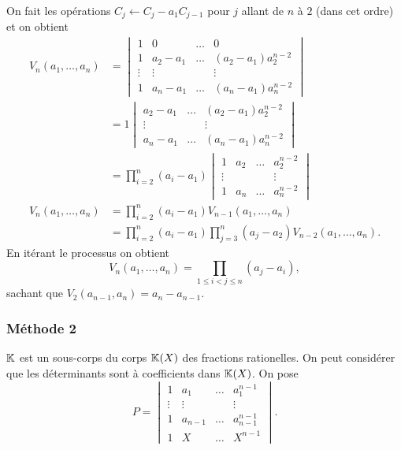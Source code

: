On fait les opérations \( C_j \leftarrow C_j - a_1C_{j-1}\) pour \(j\) allant de \(n\) à \(2\) (dans cet ordre) et on obtient
\begin{align}
V_n(a_1, \ldots, a_n) &=
  \begin{vmatrix}
    1 & 0 & \ldots & 0 \\
    1 & a_2-a_1 & \ldots & (a_2-a_1)a_2^{n-2} \\
    \vdots & \vdots &  & \vdots \\
    1 & a_n-a_1 & \ldots & (a_n-a_1)a_n^{n-2}
  \end{vmatrix}\\
  &=1
  \begin{vmatrix}
    a_2-a_1 & \ldots & (a_2-a_1)a_2^{n-2} \\
    \vdots &  & \vdots \\
    a_n-a_1 & \ldots & (a_n-a_1)a_n^{n-2}
  \end{vmatrix}\\
  &=\prod_{i=2}^n(a_i-a_1)
  \begin{vmatrix}
    1 & a_2 &\ldots & a_2^{n-2} \\
    \vdots & & & \vdots \\
    1 & a_n &\ldots & a_n^{n-2}
  \end{vmatrix}\\
V_n(a_1, \ldots, a_n)  &=\prod_{i=2}^n(a_i-a_1) V_{n-1}(a_1, \ldots, a_n) \\
&=\prod_{i=2}^n(a_i-a_1) \prod_{j=3}^n(a_j-a_2) V_{n-2}(a_1, \ldots, a_n).
\end{align}
En itérant le processus on obtient
\begin{equation}
  V_n(a_1, \ldots, a_n) = \prod_{1 \le i < j \leqslant n} (a_j-a_i),
\end{equation}
sachant que \(V_2(a_{n-1},a_n)=a_n-a_{n-1}\).

\subsubsection{Méthode 2}

\(\mathbb{K}\) est un sous-corps du corps \(\mathbb{K}(X)\) des fractions rationelles. On peut considérer que les déterminants sont à coefficients dans \(\mathbb{K}(X)\). On pose
\begin{equation}
  P = 
  \begin{vmatrix}
    1 & a_1 & \ldots & a_1^{n-1} \\
    \vdots & \vdots &  & \vdots \\
    1 & a_{n-1} & \ldots & a_{n-1}^{n-1}\\
    1 & X     & \ldots & X^{n-1}
  \end{vmatrix}.
\end{equation}

